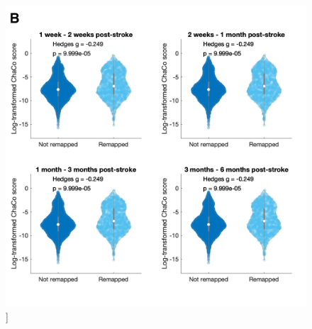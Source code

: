\documentclass[phd,tocprelim]{cornell}
\renewcommand{\caption}[1]{\singlespacing\hangcaption{#1}\normalspacing}
\begin{document}
\begin{figure}[h!]
		\ContinuedFloat
		\captionsetup{labelformat=adja-page}
    \centering
    \includegraphics[width=\textwidth]{chapter1/SupplementaryFigure14B.png}
    \caption[]{}
\end{figure}
\null
\vfill
\clearpage
\null
\vfill
\end{document}
